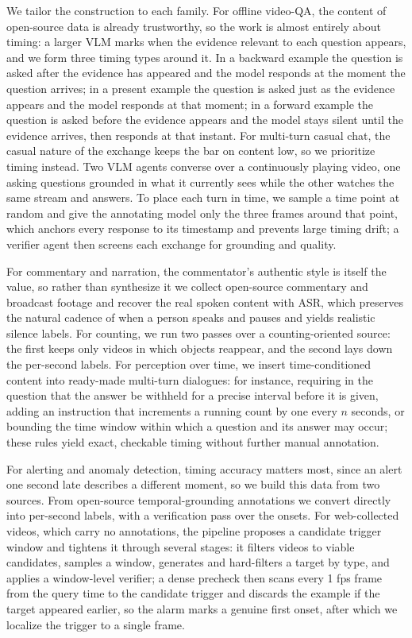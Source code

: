 \documentclass{llmxive}
\begin{document}
We tailor the construction to each family. For offline video-QA, the content of open-source data is already trustworthy, so the work is almost entirely about timing: a larger VLM marks when the evidence relevant to each question appears, and we form three timing types around it. In a backward example the question is asked after the evidence has appeared and the model responds at the moment the question arrives; in a present example the question is asked just as the evidence appears and the model responds at that moment; in a forward example the question is asked before the evidence appears and the model stays silent until the evidence arrives, then responds at that instant. For multi-turn casual chat, the casual nature of the exchange keeps the bar on content low, so we prioritize timing instead. Two VLM agents converse over a continuously playing video, one asking questions grounded in what it currently sees while the other watches the same stream and answers. To place each turn in time, we sample a time point at random and give the annotating model only the three frames around that point, which anchors every response to its timestamp and prevents large timing drift; a verifier agent then screens each exchange for grounding and quality. 

For commentary and narration, the commentator's authentic style is itself the value, so rather than synthesize it we collect open-source commentary and broadcast footage and recover the real spoken content with ASR, which preserves the natural cadence of when a person speaks and pauses and yields realistic silence labels. For counting, we run two passes over a counting-oriented source: the first keeps only videos in which objects reappear, and the second lays down the per-second labels. For perception over time, we insert time-conditioned content into ready-made multi-turn dialogues: for instance, requiring in the question that the answer be withheld for a precise interval before it is given, adding an instruction that increments a running count by one every $n$ seconds, or bounding the time window within which a question and its answer may occur; these rules yield exact, checkable timing without further manual annotation. 

 For alerting and anomaly detection, timing accuracy matters most, since an alert one second late describes a different moment, so we build this data from two sources. From open-source temporal-grounding annotations we convert directly into per-second labels, with a verification pass over the onsets. For web-collected videos, which carry no annotations, the pipeline proposes a candidate trigger window and tightens it through several stages: it filters videos to viable candidates, samples a window, generates and hard-filters a target by type, and applies a window-level verifier; a dense precheck then scans every 1 fps frame from the query time to the candidate trigger and discards the example if the target appeared earlier, so the alarm marks a genuine first onset, after which we localize the trigger to a single frame.
\end{document}

